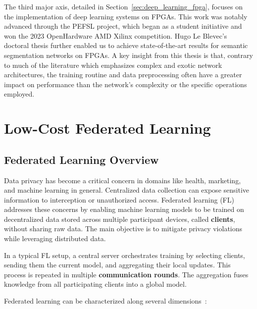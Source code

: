 \documentclass[11pt]{report}
\begin{document}
The third major axis, detailed in Section~\ref{sec:deep_learning_fpga}, focuses on the implementation of deep learning systems on FPGAs. This work was notably advanced through the PEFSL project, which began as a student initiative and won the 2023 OpenHardware AMD Xilinx competition. Hugo Le Blevec's doctoral thesis further enabled us to achieve state-of-the-art results for semantic segmentation networks on FPGAs. A key insight from this thesis is that, contrary to much of the literature which emphasizes complex and exotic network architectures, the training routine and data preprocessing often have a greater impact on performance than the network's complexity or the specific operations employed.

\newpage
\section{Low-Cost Federated Learning}
\label{sec:federated_learning}
\subsection{Federated Learning Overview}


Data privacy has become a critical concern in domains like health, marketing, and machine learning in general. Centralized data collection can expose sensitive information to interception or unauthorized access. Federated learning (FL)~\cite{konevcny2015federated} addresses these concerns by enabling machine learning models to be trained on decentralized data stored across multiple participant devices, called \textbf{clients}, without sharing raw data. The main objective is to mitigate privacy violations while leveraging distributed data.

In a typical FL setup, a central server orchestrates training by selecting clients, sending them the current model, and aggregating their local updates. This process is repeated in multiple \textbf{communication rounds}. The aggregation fuses knowledge from all participating clients into a global model.


Federated learning can be characterized along several dimensions~\cite{kairouz2021advances}:
\end{document}
